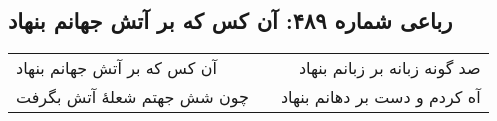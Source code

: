 \begin{center}
\section*{رباعی شماره ۴۸۹: آن کس که بر آتش جهانم بنهاد}
\label{sec:0489}
\begin{longtable}{l p{0.5cm} r}
آن کس که بر آتش جهانم بنهاد
&&
صد گونه زبانه بر زبانم بنهاد
\\
چون شش جهتم شعلهٔ آتش بگرفت
&&
آه کردم و دست بر دهانم بنهاد
\\
\end{longtable}
\end{center}
